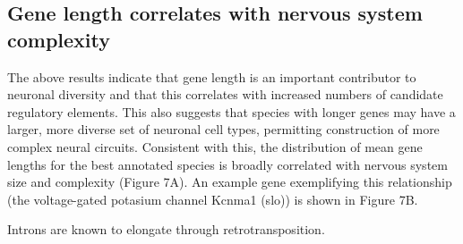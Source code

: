 \subsection{Gene length correlates with nervous system complexity}

The above results indicate that gene length is an important contributor to neuronal diversity and that this correlates with increased numbers of candidate regulatory elements. This also suggests that species with longer genes may have a larger, more diverse set of neuronal cell types, permitting construction of more complex neural circuits. Consistent with this, the distribution of mean gene lengths for the best annotated species is broadly correlated with nervous system size and complexity (Figure 7A). An example gene exemplifying this relationship (the voltage-gated potasium channel Kcnma1 (slo)) is shown in Figure 7B. 

Introns are known to elongate through retrotransposition. 
